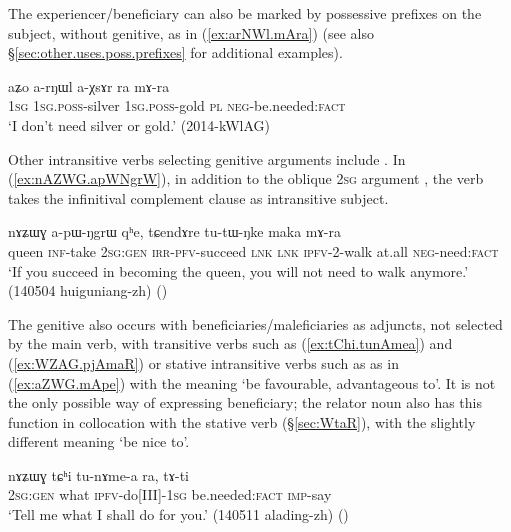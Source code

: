 The experiencer/beneficiary can also be marked by possessive prefixes on the subject, without genitive, as in (\ref{ex:arNWl.mAra}) (see also §\ref{sec:other.uses.poss.prefixes} for additional examples).

\begin{exe}
\ex \label{ex:arNWl.mAra}
 \gll aʑo a-rŋɯl a-χsɤr ra mɤ-ra \\
 \textsc{1sg} \textsc{1sg}.\textsc{poss}-silver \textsc{1sg}.\textsc{poss}-gold \textsc{pl} \textsc{neg}-be.needed:\textsc{fact} \\
 \glt `I don't  need silver or gold.' (2014-kWlAG)
\end{exe}

Other intransitive verbs selecting genitive arguments include . In (\ref{ex:nAZWG.apWNgrW}), in addition to the oblique \textsc{2sg} argument , the verb takes the infinitival complement clause  as intransitive subject.

\begin{exe}
\ex \label{ex:nAZWG.apWNgrW}
  nɤʑɯɣ a-pɯ-ŋgrɯ qʰe, tɕendɤre tu-tɯ-ŋke maka mɤ-ra \\
queen \textsc{inf}-take \textsc{2sg}:\textsc{gen} \textsc{irr}-\textsc{pfv}-succeed \textsc{lnk} \textsc{lnk} \textsc{ipfv}-2-walk at.all \textsc{neg}-need:\textsc{fact} \\
\glt `If you succeed in becoming the queen, you will not need to walk anymore.' (140504 huiguniang-zh) ()
\end{exe}

The genitive also occurs with beneficiaries/maleficiaries as adjuncts, not selected by the main verb, with transitive verbs such as  (\ref{ex:tChi.tunAmea}) and  (\ref{ex:WZAG.pjAmaR}) or stative intransitive verbs such as  as in (\ref{ex:aZWG.mApe}) with the meaning `be favourable, advantageous to'.  It is not the only possible way of expressing beneficiary; the relator noun  also has this function in collocation with the stative verb  (§\ref{sec:WtaR}), with the slightly different meaning `be nice to'.

\begin{exe}
\ex \label{ex:tChi.tunAmea}
\gll nɤʑɯɣ tɕʰi tu-nɤme-a ra, tɤ-ti  \\
\textsc{2sg}:\textsc{gen} what \textsc{ipfv}-do[III]-\textsc{1sg} be.needed:\textsc{fact} \textsc{imp}-say \\
\glt `Tell me what I shall do for you.' (140511 alading-zh)
()
\end{exe}

